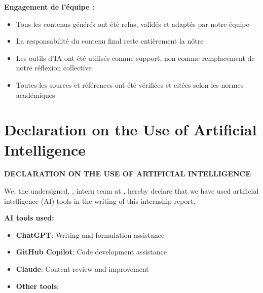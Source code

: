 {{        \vspace{0.5cm}
        
        \textbf{Engagement de l'équipe :}
        \begin{itemize}
            \item Tous les contenus générés ont été relus, validés et adaptés par notre équipe
            \item La responsabilité du contenu final reste entièrement la nôtre
            \item Les outils d'IA ont été utilisés comme support, non comme remplacement de notre réflexion collective
            \item Toutes les sources et références ont été vérifiées et citées selon les normes académiques
        \end{itemize}
        

        
        \MediaOptionLogicBlank
    }{%
        \chapter*{Declaration on the Use of Artificial Intelligence}
        
        \vspace{1cm}
        
        \begin{center}
        \textbf{DECLARATION ON THE USE OF ARTIFICIAL INTELLIGENCE}
        \end{center}
        
        \vspace{0.5cm}
        
        We, the undersigned, \textbf{\AuthorName}, intern team at \textbf{\CompanyName}, hereby declare that we have used artificial intelligence (AI) tools in the writing of this internship report.
        
        \vspace{0.5cm}
        
        \textbf{AI tools used:}
        \begin{itemize}
            \item \textbf{ChatGPT}: Writing and formulation assistance
            \item \textbf{GitHub Copilot}: Code development assistance
            \item \textbf{Claude}: Content review and improvement
            \item \textbf{Other tools}: \underline{\hspace{3cm}}
        \end{itemize}
        
}}
